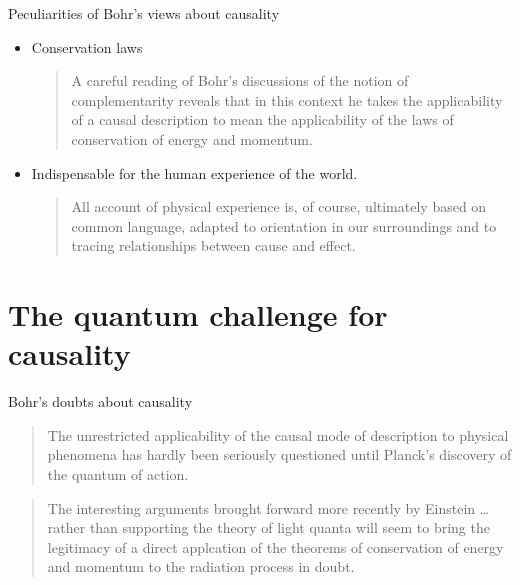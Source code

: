 \documentclass[fleqn]{beamer}
\begin{document}
\begin{frame}{Peculiarities of Bohr's views about causality}

  \begin{itemize}

  \item Conservation laws

    \medskip \begin{quote} A careful reading of Bohr’s discussions of
      the notion of complementarity reveals that in this context he
      takes the applicability of a causal description to mean the
      applicability of the laws of conservation of energy and
      momentum. \citep[p 313]{bensch} \end{quote}
  \item Indispensable for the human experience of the world.

    \medskip \begin{quote} All account of physical experience is, of
      course, ultimately based on common language, adapted to
      orientation in our surroundings and to tracing relationships
      between cause and effect. \citep[p 308]{qphil1958}
    \end{quote}

  \end{itemize}

\end{frame}

\section{The quantum challenge for causality}

\begin{frame}{Bohr's doubts about causality}

  \begin{quote} The unrestricted applicability of the causal mode of
    description to physical phenomena has hardly been seriously
    questioned until Planck's discovery of the quantum of
    action. \citep[p 11]{causal-problem} \end{quote}

  \bigskip \begin{quote} The interesting arguments brought forward
    more recently by Einstein \dots rather than supporting the theory
    of light quanta will seem to bring the legitimacy of a direct
    applcation of the theorems of conservation of energy and momentum
    to the radiation process in doubt. \citep[p
    413]{bohr1921} \end{quote}

\end{frame}
\end{document}
